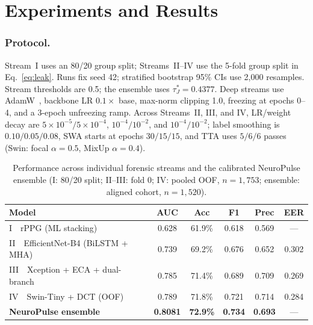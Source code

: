 \documentclass[runningheads]{llncs}
\providecommand{\Description}[1]{}
\begin{document}
\section{Experiments and Results}
\subsubsection{Protocol.}
Stream~I uses an 80/20 group split; Streams~II--IV use the 5-fold group split in Eq.~\eqref{eq:leak}. Runs fix seed 42; stratified bootstrap 95\% CIs use 2,000 resamples. Stream thresholds are 0.5; the ensemble uses $\tau^{*}_{J}=0.4377$. Deep streams use AdamW~\cite{loshchilov2019adamw}, backbone LR $0.1\times$ base, max-norm clipping 1.0, freezing at epochs 0--4, and a 3-epoch unfreezing ramp. Across Streams~II, III, and IV, LR/weight decay are $5{\times}10^{-5}/5{\times}10^{-4}$, $10^{-4}/10^{-2}$, and $10^{-4}/10^{-2}$; label smoothing is $0.10/0.05/0.08$, SWA starts at epochs $30/15/15$, and TTA uses $5/6/6$ passes (Swin: focal $\alpha{=}0.5$, MixUp $\alpha{=}0.4$).

\begin{table}[!t]
\centering
\caption{Performance across individual forensic streams and the calibrated NeuroPulse ensemble (I: 80/20 split; II--III: fold 0; IV: pooled OOF, $n{=}1,753$; ensemble: aligned cohort, $n{=}1,520$).}
\label{tab:individual}
\small
\begin{tabular}{@{}lccccc@{}}
\toprule
\textbf{Model} & \textbf{AUC} & \textbf{Acc} & \textbf{F1} & \textbf{Prec} & \textbf{EER}\\
\midrule
I\ \ rPPG (ML stacking) & 0.628 & 61.9\% & 0.618 & 0.569 & ---\\
II\ \ EfficientNet-B4 (BiLSTM + MHA) & 0.739 & 69.2\% & 0.676 & 0.652 & 0.302\\
III\ \ Xception + ECA + dual-branch & 0.785 & 71.4\% & 0.689 & 0.709 & 0.269\\
IV\ \ Swin-Tiny + DCT (OOF) & 0.789 & 71.8\% & 0.721 & 0.714 & 0.284\\
\midrule
\textbf{NeuroPulse ensemble} & \textbf{0.8081} & \textbf{72.9\%} & \textbf{0.734} & \textbf{0.693} & ---\\
\bottomrule
\end{tabular}
\Description{Metrics table comparing rPPG, EfficientNet-B4, Xception, Swin-Tiny and the NeuroPulse ensemble by AUC, accuracy, F1, precision and equal error rate.}
\end{table}
\end{document}

